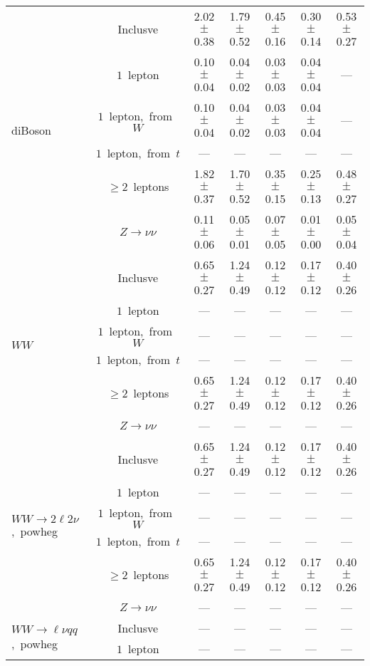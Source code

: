 \documentclass{article}
\begin{document}
\begin{longtable}{|l|c|c|c|c|c|c|}
\hline 
\multirow{6}{*}{diBoson} & Inclusve  & 2.02 $\pm$ 0.38  & 1.79 $\pm$ 0.52  & 0.45 $\pm$ 0.16  & 0.30 $\pm$ 0.14  & 0.53 $\pm$ 0.27 \\* 
 & $1$~lepton  & 0.10 $\pm$ 0.04  & 0.04 $\pm$ 0.02  & 0.03 $\pm$ 0.03  & 0.04 $\pm$ 0.04  & --- \\* 
 & $1$~lepton,~from~$W$  & 0.10 $\pm$ 0.04  & 0.04 $\pm$ 0.02  & 0.03 $\pm$ 0.03  & 0.04 $\pm$ 0.04  & --- \\* 
 & $1$~lepton,~from~$t$  & ---  & ---  & ---  & ---  & --- \\* 
 & $\ge2$~leptons  & 1.82 $\pm$ 0.37  & 1.70 $\pm$ 0.52  & 0.35 $\pm$ 0.15  & 0.25 $\pm$ 0.13  & 0.48 $\pm$ 0.27 \\* 
 & $Z\rightarrow\nu\nu$  & 0.11 $\pm$ 0.06  & 0.05 $\pm$ 0.01  & 0.07 $\pm$ 0.05  & 0.01 $\pm$ 0.00  & 0.05 $\pm$ 0.04 \\* 
\hline 
\multirow{6}{*}{$WW$} & Inclusve  & 0.65 $\pm$ 0.27  & 1.24 $\pm$ 0.49  & 0.12 $\pm$ 0.12  & 0.17 $\pm$ 0.12  & 0.40 $\pm$ 0.26 \\* 
 & $1$~lepton  & ---  & ---  & ---  & ---  & --- \\* 
 & $1$~lepton,~from~$W$  & ---  & ---  & ---  & ---  & --- \\* 
 & $1$~lepton,~from~$t$  & ---  & ---  & ---  & ---  & --- \\* 
 & $\ge2$~leptons  & 0.65 $\pm$ 0.27  & 1.24 $\pm$ 0.49  & 0.12 $\pm$ 0.12  & 0.17 $\pm$ 0.12  & 0.40 $\pm$ 0.26 \\* 
 & $Z\rightarrow\nu\nu$  & ---  & ---  & ---  & ---  & --- \\* 
\hline 
\multirow{6}{*}{$WW{\rightarrow}2\ell2\nu$,~powheg} & Inclusve  & 0.65 $\pm$ 0.27  & 1.24 $\pm$ 0.49  & 0.12 $\pm$ 0.12  & 0.17 $\pm$ 0.12  & 0.40 $\pm$ 0.26 \\* 
 & $1$~lepton  & ---  & ---  & ---  & ---  & --- \\* 
 & $1$~lepton,~from~$W$  & ---  & ---  & ---  & ---  & --- \\* 
 & $1$~lepton,~from~$t$  & ---  & ---  & ---  & ---  & --- \\* 
 & $\ge2$~leptons  & 0.65 $\pm$ 0.27  & 1.24 $\pm$ 0.49  & 0.12 $\pm$ 0.12  & 0.17 $\pm$ 0.12  & 0.40 $\pm$ 0.26 \\* 
 & $Z\rightarrow\nu\nu$  & ---  & ---  & ---  & ---  & --- \\* 
\hline 
\multirow{6}{*}{$WW{\rightarrow}{\ell}{\nu}qq$,~powheg} & Inclusve  & ---  & ---  & ---  & ---  & --- \\* 
 & $1$~lepton  & ---  & ---  & ---  & ---  & --- \\* 

\end{longtable}
\end{document}
